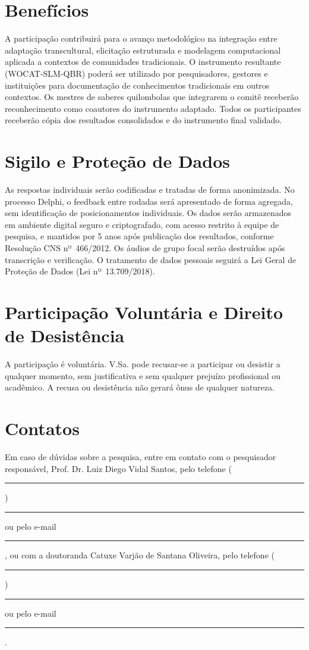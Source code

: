 \documentclass[12pt,a4paper,brazil]{article}
\begin{document}
\section*{Benefícios}

A participação contribuirá para o avanço metodológico na integração entre adaptação transcultural, elicitação estruturada e modelagem computacional aplicada a contextos de comunidades tradicionais. O instrumento resultante (WOCAT-SLM-QBR) poderá ser utilizado por pesquisadores, gestores e instituições para documentação de conhecimentos tradicionais em outros contextos. Os mestres de saberes quilombolas que integrarem o comitê receberão reconhecimento como coautores do instrumento adaptado. Todos os participantes receberão cópia dos resultados consolidados e do instrumento final validado.

\section*{Sigilo e Proteção de Dados}

As respostas individuais serão codificadas e tratadas de forma anonimizada. No processo Delphi, o feedback entre rodadas será apresentado de forma agregada, sem identificação de posicionamentos individuais. Os dados serão armazenados em ambiente digital seguro e criptografado, com acesso restrito à equipe de pesquisa, e mantidos por 5 anos após publicação dos resultados, conforme Resolução CNS nº~466/2012. Os áudios de grupo focal serão destruídos após transcrição e verificação. O tratamento de dados pessoais seguirá a Lei Geral de Proteção de Dados (Lei nº~13.709/2018).

\section*{Participação Voluntária e Direito de Desistência}

A participação é voluntária. V.Sa. pode recusar-se a participar ou desistir a qualquer momento, sem justificativa e sem qualquer prejuízo profissional ou acadêmico. A recusa ou desistência não gerará ônus de qualquer natureza.

\section*{Contatos}

Em caso de dúvidas sobre a pesquisa, entre em contato com o pesquisador responsável, Prof. Dr. Luiz Diego Vidal Santos, pelo telefone (\rule{1.5cm}{0.4pt}) \rule{3cm}{0.4pt} ou pelo e-mail \rule{5cm}{0.4pt}, ou com a doutoranda Catuxe Varjão de Santana Oliveira, pelo telefone (\rule{1.5cm}{0.4pt}) \rule{3cm}{0.4pt} ou pelo e-mail \rule{5cm}{0.4pt}.
\end{document}
